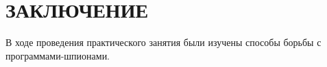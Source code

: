 \section*{ЗАКЛЮЧЕНИЕ}

В ходе проведения практического занятия были изучены способы борьбы с
программами-шпионами.

\newpage